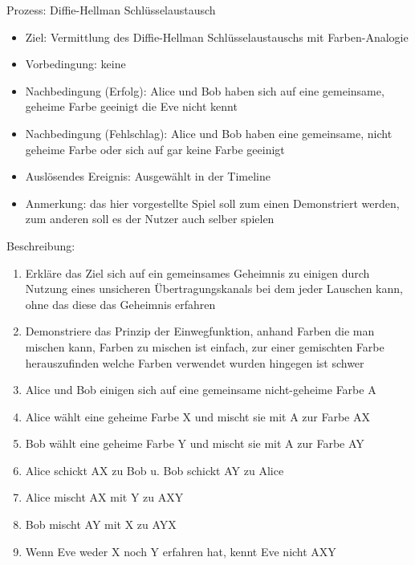 \documentclass{article}
\begin{document}
\begin{FA}[start=100]
\item Prozess: Diffie-Hellman Schlüsselaustausch
\end{FA}
\begin{itemize}[label={}]
    \item Ziel: Vermittlung des Diffie-Hellman Schlüsselaustauschs mit Farben-Analogie
    \item Vorbedingung: keine
    \item Nachbedingung (Erfolg): Alice und Bob haben sich auf eine 
        gemeinsame, geheime Farbe geeinigt die Eve nicht kennt
    \item Nachbedingung (Fehlschlag): Alice und Bob haben eine gemeinsame, 
        nicht geheime Farbe oder sich auf gar keine Farbe geeinigt
    \item Auslösendes Ereignis: Ausgewählt in der Timeline
    \item Anmerkung: das hier vorgestellte Spiel 
        soll zum einen Demonstriert werden,
        zum anderen soll es der Nutzer auch selber spielen
\end{itemize}

Beschreibung:
\begin{enumerate}
    \item Erkläre das Ziel sich auf ein gemeinsames Geheimnis zu einigen
        durch Nutzung eines unsicheren Übertragungskanals
        bei dem jeder Lauschen kann, ohne das diese das Geheimnis erfahren
    \item Demonstriere das Prinzip der Einwegfunktion, anhand Farben die man mischen
        kann, Farben zu mischen ist einfach, zur einer gemischten Farbe
        herauszufinden welche Farben verwendet wurden hingegen ist schwer
    \item Alice und Bob einigen sich auf eine gemeinsame nicht-geheime Farbe A
    \item Alice wählt eine geheime Farbe X und mischt sie mit A zur Farbe AX
    \item Bob wählt eine geheime Farbe Y und mischt sie mit A zur Farbe AY
    \item Alice schickt AX zu Bob u. Bob schickt AY zu Alice
    \item Alice mischt AX mit Y zu AXY
    \item Bob mischt AY mit X zu AYX
    \item Wenn Eve weder X noch Y erfahren hat, kennt Eve nicht AXY
\end{enumerate}
\end{document}

